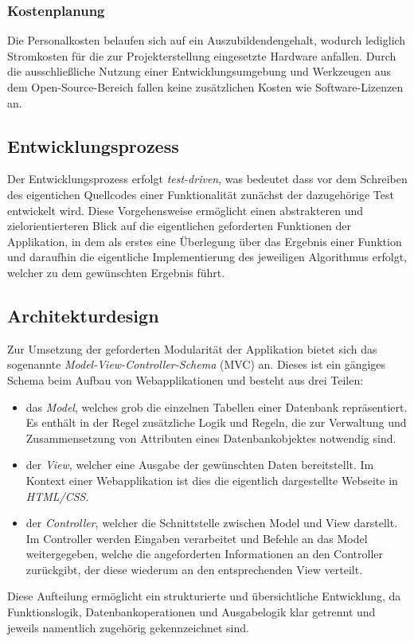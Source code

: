 \subsubsection{Kostenplanung}
\label{sec:Kostenplanung}
Die Personalkosten belaufen sich auf ein Auszubildendengehalt, wodurch lediglich Stromkosten für die
zur Projekterstellung eingesetzte Hardware anfallen. Durch die ausschließliche Nutzung einer
Entwicklungsumgebung und Werkzeugen aus dem Open-Source-Bereich fallen keine zusätzlichen Kosten wie
Software-Lizenzen an.

\subsection{Entwicklungsprozess}
\label{sec:Entwicklungsprozess}
Der Entwicklungsprozess erfolgt \textit{test-driven}, was bedeutet dass vor dem Schreiben des eigentichen
Quellcodes einer Funktionalität zunächst der dazugehörige Test entwickelt wird. Diese Vorgehensweise
ermöglicht einen abstrakteren und zielorientierteren Blick auf die eigentlichen geforderten
Funktionen der Applikation, in dem als erstes eine Überlegung über das Ergebnis einer Funktion
und daraufhin die eigentliche Implementierung des jeweiligen Algorithmus erfolgt, welcher zu dem
gewünschten Ergebnis führt.

\subsection{Architekturdesign}
\label{sec:Architekturdesign}
Zur Umsetzung der geforderten Modularität der Applikation bietet sich das sogenannte
\textit{Model-View-Controller-Schema} (MVC) an. Dieses ist ein gängiges Schema beim Aufbau von Webapplikationen und
besteht aus drei Teilen:
\begin{itemize}
	\item das \textit{Model}, welches grob die einzelnen Tabellen einer Datenbank repräsentiert. Es enthält in
	der Regel zusätzliche Logik und Regeln, die zur Verwaltung und Zusammensetzung von Attributen
	eines Datenbankobjektes notwendig sind.
	\item der \textit{View}, welcher eine Ausgabe der gewünschten Daten bereitstellt. Im Kontext einer
	Webapplikation ist dies die eigentlich dargestellte Webseite in \textit{HTML/CSS}.
	\item der \textit{Controller}, welcher die Schnittstelle zwischen Model und View darstellt.
	Im Controller werden Eingaben verarbeitet und Befehle an das Model weitergegeben, welche
	die angeforderten Informationen an den Controller zurückgibt, der diese wiederum an den
	entsprechenden View verteilt.
\end{itemize}
Diese Aufteilung ermöglicht ein strukturierte und übersichtliche Entwicklung, da Funktionslogik,
Datenbankoperationen und Ausgabelogik klar getrennt und jeweils namentlich zugehörig gekennzeichnet
sind.

